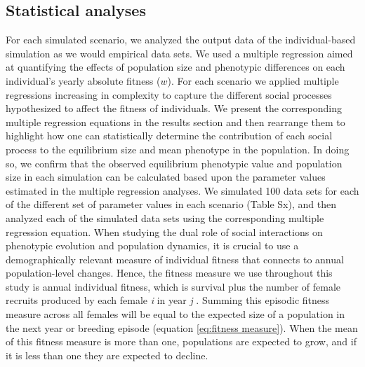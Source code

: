 \documentclass{article}
\begin{document}
\subsection{Statistical analyses}

For each simulated scenario, we analyzed the output data of the individual-based simulation as we would empirical data sets. We used a multiple regression aimed at quantifying the effects of population size and phenotypic differences on each individual's yearly absolute fitness ($w$). For each scenario we applied multiple regressions increasing in complexity to capture the different social processes hypothesized to affect the fitness of individuals. We present the corresponding multiple regression equations in the results section and then rearrange them to highlight how one can statistically determine the contribution of each social process to the equilibrium size and mean phenotype in the population. In doing so, we confirm that the observed equilibrium phenotypic value and population size in each simulation can be calculated based upon the parameter values estimated in the multiple regression analyses. We simulated 100 data sets for each of the different set of parameter values in each scenario (Table Sx), and then analyzed each of the simulated data sets using the corresponding multiple regression equation. When studying the dual role of social interactions on phenotypic evolution and population dynamics, it is crucial to use a demographically relevant measure of individual fitness that connects to annual population-level changes. Hence, the fitness measure we use throughout this study is annual individual fitness, which is survival plus the number of female recruits produced by each female \textit{i} in year \textit{j} \citep{Saether2015}. Summing this episodic fitness measure across all females will be equal to the expected size of a population in the next year or breeding episode (equation  \ref{eq:fitness measure}). When the mean of this fitness measure is more than one, populations are expected to grow, and if it is less than one they are expected to decline. 
\end{document}
